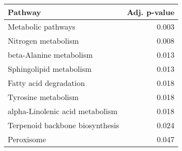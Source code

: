 \begin{tabular}{lr}
\toprule
                         Pathway &  Adj. p-value \\
\midrule
              Metabolic pathways &         0.003 \\
             Nitrogen metabolism &         0.008 \\
         beta-Alanine metabolism &         0.013 \\
         Sphingolipid metabolism &         0.013 \\
          Fatty acid degradation &         0.018 \\
             Tyrosine metabolism &         0.018 \\
 alpha-Linolenic acid metabolism &         0.018 \\
 Terpenoid backbone biosynthesis &         0.024 \\
                      Peroxisome &         0.047 \\
\bottomrule
\end{tabular}
